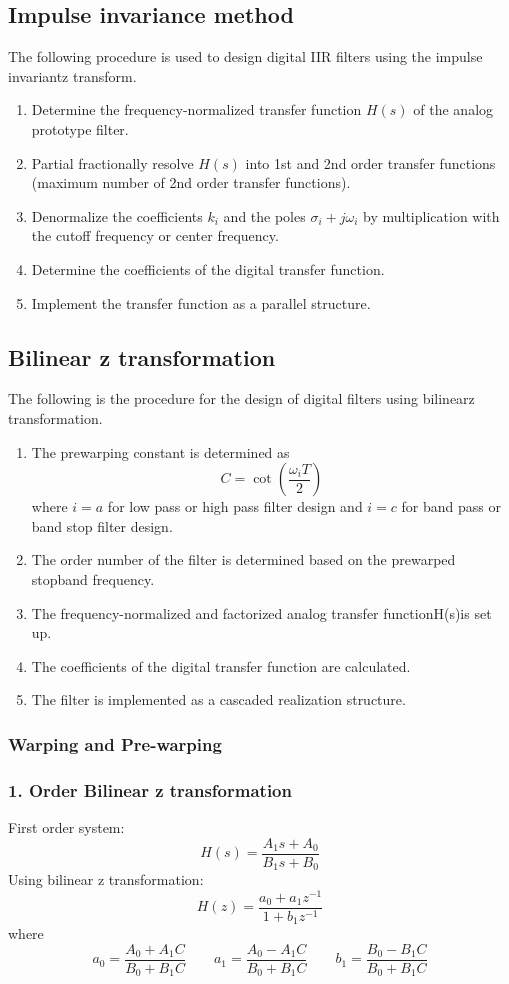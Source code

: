 \subsection{Impulse invariance method}
The following procedure is used to design digital IIR filters using the impulse invariantz transform.
\begin{enumerate}
  \item Determine the frequency-normalized transfer function $H(s)$ of the analog prototype filter.
  \item Partial fractionally resolve $H(s)$ into 1st and 2nd order transfer functions (maximum number of 2nd order transfer functions).
  \item Denormalize the coefficients $k_i$ and the poles $\sigma_i+j\omega_i$ by multiplication with the cutoff frequency or center frequency.
  \item Determine the coefficients of the digital transfer function.
  \item Implement the transfer function as a parallel structure.
\end{enumerate}
\subsection{Bilinear z transformation}
The following is the procedure for the design of digital filters using bilinearz transformation.
\begin{enumerate}
  \item The prewarping constant is determined as
    $$C=\cot\left(\frac{\omega_iT}{2}\right)$$
    where $i=a$ for low pass or high pass filter design and $i=c$ for band pass or band stop filter design.
  \item The order number of the filter is determined based on the prewarped stopband frequency.
  \item The frequency-normalized and factorized analog transfer functionH(s)is set up.
  \item The coefficients of the digital transfer function are calculated.
  \item The filter is implemented as a cascaded realization structure.
\end{enumerate}
\subsubsection{Warping and Pre-warping}
\subsubsection{1. Order Bilinear z transformation}
First order system:
$$H(s)=\frac{A_{1}s+A_{0}}{B_{1}s+B_{0}}$$
Using bilinear z transformation:
$$H(z)=\frac{a_0+a_1z^{-1}}{1+b_1z^{-1}}$$
where
$$a_{0}=\frac{A_{0}+A_{1}C}{B_{0}+B_{1}C}\qquad a_{1}=\frac{A_{0}-A_{1}C}{B_{0}+B_{1}C}\qquad b_{1}=\frac{B_{0}-B_{1}C}{B_{0}+B_{1}C}$$
